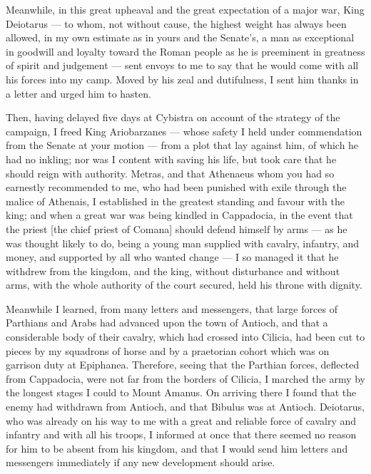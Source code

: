  Meanwhile, in this great upheaval and the great expectation of a major war, King Deiotarus --- to whom, not without cause, the highest weight has always been allowed, in my own estimate as in yours and the Senate's, a man as exceptional in goodwill and loyalty toward the Roman people as he is preeminent in greatness of spirit and judgement --- sent envoys to me to say that he would come with all his forces into my camp. Moved by his zeal and dutifulness, I sent him thanks in a letter and urged him to hasten.

 Then, having delayed five days at Cybistra on account of the strategy of the campaign, I freed King Ariobarzanes --- whose safety I held under commendation from the Senate at your motion --- from a plot that lay against him, of which he had no inkling; nor was I content with saving his life, but took care that he should reign with authority. Metras, and that Athenaeus whom you had so earnestly recommended to me, who had been punished with exile through the malice of Athenais, I established in the greatest standing and favour with the king; and when a great war was being kindled in Cappadocia, in the event that the priest [the chief priest of Comana] should defend himself by arms --- as he was thought likely to do, being a young man supplied with cavalry, infantry, and money, and supported by all who wanted change --- I so managed it that he withdrew from the kingdom, and the king, without disturbance and without arms, with the whole authority of the court secured, held his throne with dignity.

 Meanwhile I learned, from many letters and messengers, that large forces of Parthians and Arabs had advanced upon the town of Antioch, and that a considerable body of their cavalry, which had crossed into Cilicia, had been cut to pieces by my squadrons of horse and by a praetorian cohort which was on garrison duty at Epiphanea. Therefore, seeing that the Parthian forces, deflected from Cappadocia, were not far from the borders of Cilicia, I marched the army by the longest stages I could to Mount Amanus. On arriving there I found that the enemy had withdrawn from Antioch, and that Bibulus was at Antioch. Deiotarus, who was already on his way to me with a great and reliable force of cavalry and infantry and with all his troops, I informed at once that there seemed no reason for him to be absent from his kingdom, and that I would send him letters and messengers immediately if any new development should arise.

